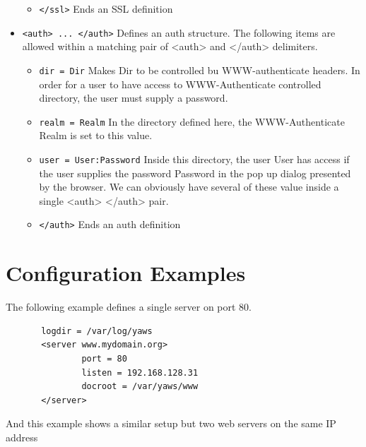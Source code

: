 \documentclass[11pt,oneside,english]{book}
\begin{document}
\begin{itemize}
\begin{itemize}
\item        \verb+</ssl>+
              Ends an SSL definition
\end{itemize}


\item       \verb+<auth> ... </auth>+
              Defines an  auth  structure.  The  following
              items  are allowed within a matching pair of
              <auth> and </auth> delimiters.

\begin{itemize}

\item       \verb+dir = Dir+
              Makes Dir to be controlled bu  WWW-authenticate
              headers.  In  order for a user to have
              access to WWW-Authenticate controlled  directory,
              the user must supply a password.

\item       \verb+realm = Realm+
              In  the  directory  defined  here,  the WWW-Authenticate
              Realm is set to this value.

\item       \verb+user = User:Password+
              Inside this directory,  the  user  User  has
              access  if  the  user  supplies the password
              Password in the pop up dialog presented  by
              the  browser.  We can obviously have several
              of  these  value  inside  a  single   <auth>
              </auth> pair.

\item       \verb+</auth>+
              Ends an auth definition


\end{itemize}

\end{itemize}







\section{Configuration Examples}



       The  following  example  defines a single server on
       port 80.

\begin{verbatim}
       logdir = /var/log/yaws
       <server www.mydomain.org>
               port = 80
               listen = 192.168.128.31
               docroot = /var/yaws/www
       </server>

\end{verbatim}
       And this example shows a similar setup but two web­
       servers on the same IP address
\end{document}
